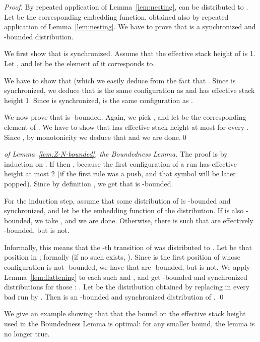 \documentclass{llncs}
\begin{document}
\begin{definition}
\begin{proof}
    By repeated application of Lemma~\ref{lem:nesting},  can be 
    distributed to . Let  be the
    corresponding embedding function, obtained also by repeated 
    application of Lemma~\ref{lem:nesting}. We have to prove 
    that  is a synchronized and -bounded distribution. 

  We first show that  is synchronized. Assume that the effective
  stack height of  is 1. Let , and let  be the element of  it
  corresponds to.

  We have to show that  (which we
  easily deduce from the fact that . Since  is synchronized, 
    we deduce that  is
  the same configuration as  and has effective stack height 1.
  Since  is synchronized,  is the same configuration as
  .
  
   We now prove  that  is  -bounded. 
   Again, we pick , and let  be the corresponding
  element of .  We have to show that  has effective stack height at most  for  every . Since , by monotonicity we deduce that
   and we are done.\qed
\end{proof}

\begin{proof}[of Lemma~\ref{lem:Z-N-bounded}, the Boundedness Lemma]
  The proof is by induction on . If  then , because the first configuration of a run has
  effective height at most 2 (if the first rule was a push, and that
  symbol will be later popped). Since by definition , we get that
   is -bounded.

For the induction step, assume that some distribution  of
 is -bounded and synchronized, and let  be the
embedding function of the distribution. If  is also
-bounded, we take , and we are done. Otherwise,
there is  such that  are effectively -bounded, but  is not.

Informally, this means that the -th transition of  was
distributed to . Let  be that position in ;
formally  (if no such  exists,
).
Since  is the first position of  whose configuration
is not -bounded, we have that  are -bounded, but  is not.
We apply Lemma~\ref{lem:flattening} to each such  and , and get 
-bounded and synchronized distributions for those : .  Let  be the distribution obtained by replacing in
 every bad run  by . Then  is an -bounded and synchronized distribution
of . \qed
\end{proof}

\begin{example}
We give an example showing that that the bound on the effective stack
height used in the Boundedness Lemma is optimal: for any smaller bound, the lemma is no
longer true.  


\end{example}
\end{definition}
\end{document}
